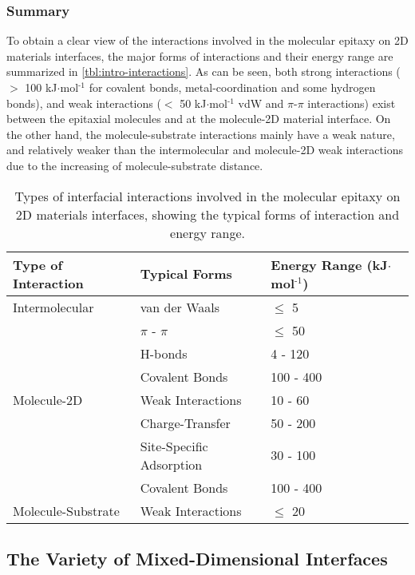 \subsubsection{Summary}
\label{sec:org697d552}

To obtain a clear view of the interactions involved in the molecular
epitaxy on 2D materials interfaces, the major forms
of interactions and their energy range are summarized in
\autoref{tbl:intro-interactions}. As can be seen, both strong interactions ($>$ 100
kJ\(\cdot\)mol\(^{\text{-1}}\) for covalent bonds, metal-coordination and some
hydrogen bonds), and weak interactions ($<$ 50 kJ\(\cdot\)mol\(^{\text{-1}}\) vdW
and \(\pi\)-\(\pi\) interactions) exist between the epitaxial molecules and at
the molecule-2D material interface. On the other hand, the
molecule-substrate interactions mainly have a weak nature, and
relatively weaker than the intermolecular and molecule-2D weak
interactions due to the increasing of molecule-substrate distance.

\begin{table}[htbp]
\caption{\label{tbl:intro-interactions}
Types of interfacial interactions involved in the molecular epitaxy on 2D materials interfaces, showing the typical forms of interaction and energy range.}
\small
\centering
  \begin{tabular}[\textwidth]{lll}
\hline
Type of Interaction & Typical Forms & Energy Range  (kJ\(\cdot\)mol\(^{\text{-1}}\))\\
\hline
Intermolecular & van der Waals & \(\le\) 5\\
 & \(\pi\) - \(\pi\) & \(\le\) 50\\
 & H-bonds & 4 - 120 ~\cite{jeffrey_introduction_1997}\\
 & Covalent Bonds & 100 - 400\\
\hline
Molecule-2D & Weak Interactions & 10 - 60 ~\cite{Lazar_2013}\\
 & Charge-Transfer & 50 - 200\\
 & Site-Specific Adsorption & 30 - 100\\
 & Covalent Bonds & 100 - 400\\
\hline
Molecule-Substrate & Weak Interactions & \(\le\) 20\\
\hline
\end{tabular}
\end{table}

\subsection{The Variety of Mixed-Dimensional Interfaces}
\label{sec:vari-mixed-dimens}

